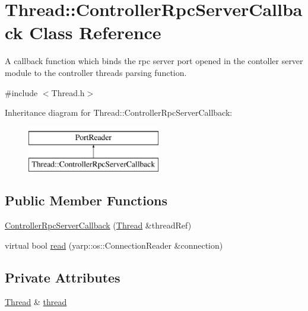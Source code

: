 \hypertarget{classThread_1_1ControllerRpcServerCallback}{}\section{Thread\+:\+:Controller\+Rpc\+Server\+Callback Class Reference}
\label{classThread_1_1ControllerRpcServerCallback}


A callback function which binds the rpc server port opened in the contoller server module to the controller thread\textquotesingle{}s parsing function.  




{\ttfamily \#include $<$Thread.\+h$>$}

Inheritance diagram for Thread\+:\+:Controller\+Rpc\+Server\+Callback\+:\begin{figure}[H]
\begin{center}
\leavevmode
\includegraphics[height=2.000000cm]{classThread_1_1ControllerRpcServerCallback}
\end{center}
\end{figure}
\subsection*{Public Member Functions}
\begin{DoxyCompactItemize}
\item 
\hyperlink{classThread_1_1ControllerRpcServerCallback_ad836e4cdaafc42ad309b5248ef38c280}{Controller\+Rpc\+Server\+Callback} (\hyperlink{classThread}{Thread} \&thread\+Ref)
\item 
virtual bool \hyperlink{classThread_1_1ControllerRpcServerCallback_a61f5510543f1bb96793dceca13eb6865}{read} (yarp\+::os\+::\+Connection\+Reader \&connection)
\end{DoxyCompactItemize}
\subsection*{Private Attributes}
\begin{DoxyCompactItemize}
\item 
\hyperlink{classThread}{Thread} \& \hyperlink{classThread_1_1ControllerRpcServerCallback_a466f100742fdac49e0016ec2f0c43536}{thread}
\end{DoxyCompactItemize}


